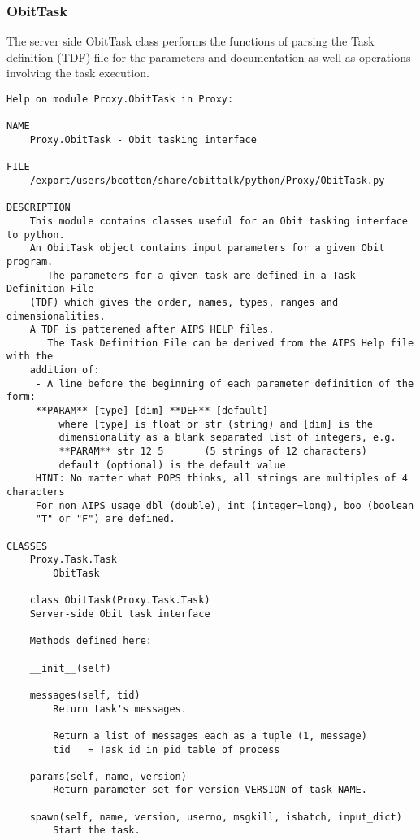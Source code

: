 \documentclass[11pt]{report}
\begin{document}
\subsubsection{ObitTask}
The server side ObitTask class performs the functions of parsing the
Task definition (TDF) file for the parameters and documentation as
well as operations involving the task execution.
\begin{verbatim}
Help on module Proxy.ObitTask in Proxy:

NAME
    Proxy.ObitTask - Obit tasking interface

FILE
    /export/users/bcotton/share/obittalk/python/Proxy/ObitTask.py

DESCRIPTION
    This module contains classes useful for an Obit tasking interface to python.
    An ObitTask object contains input parameters for a given Obit program.
       The parameters for a given task are defined in a Task Definition File
    (TDF) which gives the order, names, types, ranges and dimensionalities.
    A TDF is patterened after AIPS HELP files.
       The Task Definition File can be derived from the AIPS Help file with the
    addition of:
     - A line before the beginning of each parameter definition of the form:
     **PARAM** [type] [dim] **DEF** [default]
         where [type] is float or str (string) and [dim] is the 
         dimensionality as a blank separated list of integers, e.g.
         **PARAM** str 12 5       (5 strings of 12 characters)
         default (optional) is the default value
     HINT: No matter what POPS thinks, all strings are multiples of 4 characters
     For non AIPS usage dbl (double), int (integer=long), boo (boolean
     "T" or "F") are defined.

CLASSES
    Proxy.Task.Task
        ObitTask
    
    class ObitTask(Proxy.Task.Task)
    Server-side Obit task interface
    
    Methods defined here:
    
    __init__(self)
    
    messages(self, tid)
        Return task's messages.
        
        Return a list of messages each as a tuple (1, message)
        tid   = Task id in pid table of process
    
    params(self, name, version)
        Return parameter set for version VERSION of task NAME.
    
    spawn(self, name, version, userno, msgkill, isbatch, input_dict)
        Start the task.
        

\end{verbatim}
\end{document}

